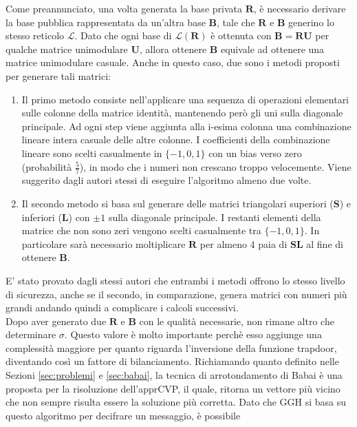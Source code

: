 Come preannunciato, una volta generata la base privata $\mathbf{R}$, è necessario 
derivare la base pubblica rappresentata da un'altra base $\mathbf{B}$, tale che $\mathbf{R}$ 
e $\mathbf{B}$ generino lo stesso reticolo $\mathcal{L}$. Dato che ogni base di 
$\mathcal{L}(\mathbf{R})$ è ottenuta con $\mathbf{B} = \mathbf{R}\mathbf{U}$ per qualche matrice
unimodulare $\mathbf{U}$, allora ottenere $\mathbf{B}$ equivale ad ottenere una matrice
unimodulare casuale. Anche in questo caso, due sono i metodi proposti per generare tali matrici:
\begin{enumerate}
    \item Il primo metodo consiste nell'applicare una sequenza di operazioni elementari 
    sulle colonne della matrice identità, mantenendo però gli uni sulla diagonale principale.
    Ad ogni step viene aggiunta alla i-esima colonna una combinazione lineare intera casuale
    delle altre colonne. I coefficienti della combinazione lineare sono scelti casualmente
    in $\{-1,0,1\}$ con un bias verso zero (probabilità $\frac{5}{7}$), in modo che i numeri non
    crescano troppo velocemente. Viene suggerito dagli autori stessi di eseguire l'algoritmo
    almeno due volte.
    \item Il secondo metodo si basa sul generare delle matrici triangolari superiori 
    ($\mathbf{S}$) e inferiori ($\mathbf{L}$) con $\pm1$ sulla diagonale principale. I 
    restanti elementi della matrice che non sono zeri vengono scelti casualmente tra
    $\{-1,0,1\}$. In particolare sarà necessario moltiplicare $\mathbf{R}$ per almeno 4
    paia di $\mathbf{S}\mathbf{L}$ al fine di ottenere $\mathbf{B}$.
\end{enumerate}
E' stato provato dagli stessi autori che entrambi i metodi offrono lo stesso livello di sicurezza,
anche se il secondo, in comparazione, genera matrici con numeri più grandi andando quindi a 
complicare i calcoli successivi. \\
Dopo aver generato due $\mathbf{R}$ e $\mathbf{B}$ con le qualità necessarie, non
rimane altro che determinare $\sigma$. Questo valore è molto importante perchè esso aggiunge
una complessità maggiore per quanto riguarda l'inversione della funzione trapdoor, diventando
così un fattore di bilanciamento. Richiamando quanto definito nelle Sezioni \ref{sec:problemi}
e \ref{sec:babai}, la tecnica di arrotondamento di Babai è una proposta per la risoluzione 
dell'apprCVP, il quale, ritorna un vettore più vicino che non sempre risulta essere la soluzione più
corretta. Dato che GGH si basa su questo algoritmo per decifrare un messaggio, è possibile
